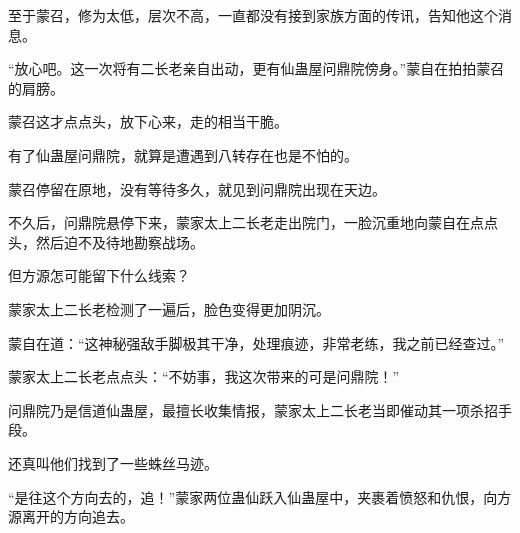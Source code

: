 \begin{this_body}
至于蒙召，修为太低，层次不高，一直都没有接到家族方面的传讯，告知他这个消息。

“放心吧。这一次将有二长老亲自出动，更有仙蛊屋问鼎院傍身。”蒙自在拍拍蒙召的肩膀。

蒙召这才点点头，放下心来，走的相当干脆。

有了仙蛊屋问鼎院，就算是遭遇到八转存在也是不怕的。

蒙召停留在原地，没有等待多久，就见到问鼎院出现在天边。

不久后，问鼎院悬停下来，蒙家太上二长老走出院门，一脸沉重地向蒙自在点点头，然后迫不及待地勘察战场。

但方源怎可能留下什么线索？

蒙家太上二长老检测了一遍后，脸色变得更加阴沉。

蒙自在道：“这神秘强敌手脚极其干净，处理痕迹，非常老练，我之前已经查过。”

蒙家太上二长老点点头：“不妨事，我这次带来的可是问鼎院！”

问鼎院乃是信道仙蛊屋，最擅长收集情报，蒙家太上二长老当即催动其一项杀招手段。

还真叫他们找到了一些蛛丝马迹。

“是往这个方向去的，追！”蒙家两位蛊仙跃入仙蛊屋中，夹裹着愤怒和仇恨，向方源离开的方向追去。

\end{this_body}


